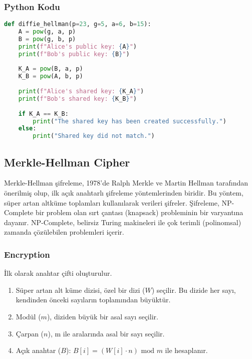 \subsubsection{Python Kodu}

\begin{lstlisting}[language=Python]
def diffie_hellman(p=23, g=5, a=6, b=15):
    A = pow(g, a, p)
    B = pow(g, b, p)
    print(f"Alice's public key: {A}")
    print(f"Bob's public key: {B}")
    
    K_A = pow(B, a, p)
    K_B = pow(A, b, p)
    
    print(f"Alice's shared key: {K_A}")
    print(f"Bob's shared key: {K_B}")
    
    if K_A == K_B:
        print("The shared key has been created successfully.")
    else:
        print("Shared key did not match.")
\end{lstlisting}

\newpage

\subsection{Merkle-Hellman Cipher}

Merkle-Hellman şifreleme, 1978'de Ralph Merkle ve Martin Hellman tarafından önerilmiş olup, ilk açık anahtarlı şifreleme yöntemlerinden biridir. Bu yöntem, süper artan altküme toplamları kullanılarak verileri şifreler. Şifreleme, NP-Complete bir problem olan sırt çantası (knapsack) probleminin bir varyantına dayanır. NP-Complete, belirsiz Turing makineleri ile çok terimli (polinomsal) zamanda çözülebilen problemleri içerir. 

\subsubsection{Encryption}

İlk olarak anahtar çifti oluşturulur.

\begin{enumerate}
    \item Süper artan alt küme dizisi, özel bir dizi ($W$) seçilir. Bu dizide her sayı, kendinden önceki sayıların toplamından büyüktür.
    \item Modül ($m$), diziden büyük bir asal sayı seçilir.
    \item Çarpan ($n$), m ile aralarında asal bir sayı seçilir.
    \item Açık anahtar ($B$): $B[i] = (W[i] \cdot n) \text{ mod } m$ ile hesaplanır.
\end{enumerate}


